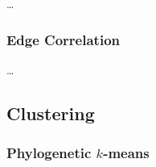 \documentclass[10pt,letterpaper]{article}
\begin{document}
\ldots


\subsubsection*{Edge Correlation}
\label{sec:MaterialsMethods:sub:Visualization:sub:Correlation}

\ldots





\subsection*{Clustering}
\label{sec:MaterialsMethods:sub:Clustering}



\subsubsection*{Phylogenetic \texorpdfstring{$k$-means}{k-means}}
\label{sec:MaterialsMethods:sub:Clustering:sub:kmeans}
\end{document}
